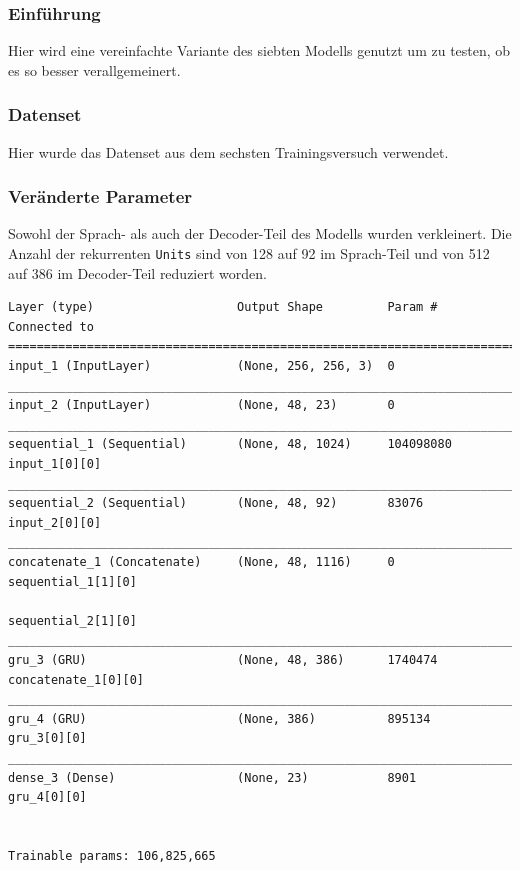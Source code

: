 \documentclass[pdftex,a4paper,halfparskip, article]{scrartcl}
\begin{document}

\subsubsection*{Einführung}

Hier wird eine vereinfachte Variante des siebten Modells genutzt um zu testen, ob es so besser verallgemeinert.

\subsubsection*{Datenset}

Hier wurde das Datenset aus dem sechsten Trainingsversuch verwendet.

\subsubsection*{Veränderte Parameter}

Sowohl der Sprach- als auch der Decoder-Teil des Modells wurden verkleinert. Die Anzahl der rekurrenten \texttt{Units} sind von 128 auf 92 im Sprach-Teil und von 512 auf 386 im Decoder-Teil reduziert worden.

\begin{verbatim}
Layer (type)                    Output Shape         Param #     Connected to
=============================================================================
input_1 (InputLayer)            (None, 256, 256, 3)  0
_____________________________________________________________________________
input_2 (InputLayer)            (None, 48, 23)       0
_____________________________________________________________________________
sequential_1 (Sequential)       (None, 48, 1024)     104098080   input_1[0][0]
_____________________________________________________________________________
sequential_2 (Sequential)       (None, 48, 92)       83076       input_2[0][0]
_____________________________________________________________________________
concatenate_1 (Concatenate)     (None, 48, 1116)     0           sequential_1[1][0]
                                                                 sequential_2[1][0]
_____________________________________________________________________________
gru_3 (GRU)                     (None, 48, 386)      1740474     concatenate_1[0][0]
_____________________________________________________________________________
gru_4 (GRU)                     (None, 386)          895134      gru_3[0][0]
_____________________________________________________________________________
dense_3 (Dense)                 (None, 23)           8901        gru_4[0][0]


Trainable params: 106,825,665
\end{verbatim}
\end{document}
